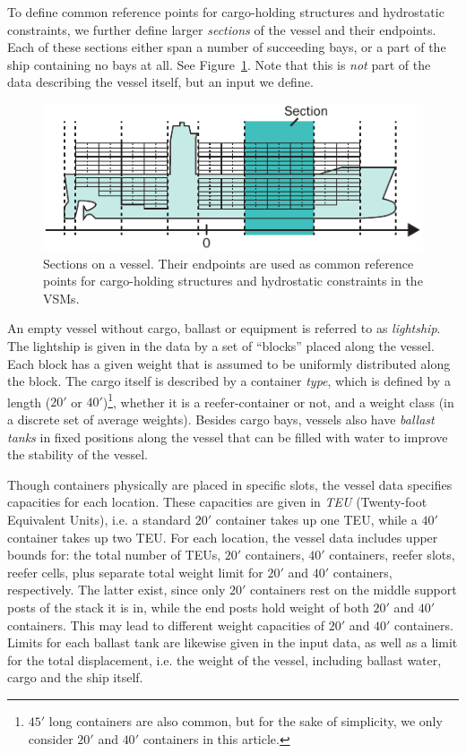 \documentclass[citeauthoryear]{llncs}
\begin{document}
To define common reference points for cargo-holding structures and hydrostatic constraints, we further define larger \emph{sections} of the vessel and their endpoints. Each of these sections either span a number of succeeding bays, or a part of the ship containing no bays at all.
See Figure~\ref{fig:sectionEndPoints}. Note that this is \emph{not} part of the data describing the vessel itself, but an input we define.

\begin{figure}[htbp]
	\centering
		\includegraphics{figures/sectionEndPoints.pdf}
	\caption{Sections on a vessel. Their endpoints are used as common reference points for cargo-holding structures and hydrostatic constraints in the VSMs.}
	\label{fig:sectionEndPoints}
\end{figure}

An empty vessel without cargo, ballast or equipment is referred to as \emph{lightship}.  The lightship is given in the data by a set of ``blocks'' placed along the vessel. Each block has a given weight that is assumed to be uniformly distributed along the block.
The cargo itself is described by a container \emph{type}, which is defined by a length ($20'$ or $40'$)\footnote{$45'$ long containers are also common, but for the sake of simplicity, we only consider $20'$ and $40'$ containers in this article.}, whether it is a reefer-container or not, and a weight class (in a discrete set of average weights). 
Besides cargo bays, vessels also have \emph{ballast tanks} in fixed positions along the vessel that can be filled with water to improve the stability of the vessel.

Though containers physically are placed in specific slots, the vessel data specifies capacities for each location. These capacities are given in \emph{TEU} (Twenty-foot Equivalent Units), i.e. a standard $20'$ container takes up one TEU, while a $40'$ container takes up two TEU. For each location, the vessel data includes upper bounds for: the total number of TEUs, $20'$ containers, $40'$ containers, reefer slots, reefer cells, plus separate total weight limit for $20'$ and $40'$ containers, respectively. The latter exist, since only $20'$ containers rest on the middle support posts of the stack it is in, while the end posts hold weight of both $20'$ and $40'$ containers. This may lead to different weight capacities of $20'$ and $40'$ containers. Limits for each ballast tank are likewise given in the input data, as well as a limit for the total displacement, i.e. the weight of the vessel, including ballast water, cargo and the ship itself. 
\end{document}
